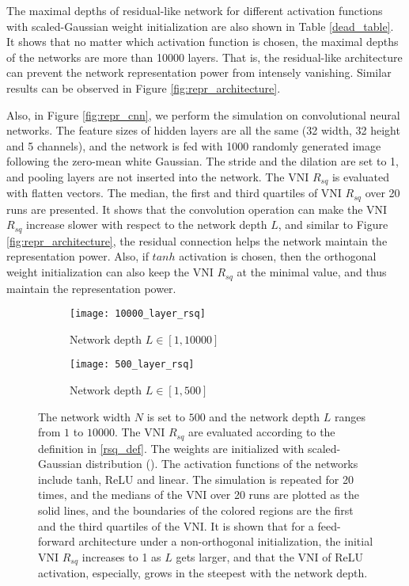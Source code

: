 The maximal depths of residual-like network for different activation functions with scaled-Gaussian
weight initialization are also shown in Table \ref{dead_table}.
It shows that no matter which activation function is chosen, the maximal depths of the networks are
more than 10000 layers. That is, the residual-like architecture can prevent the network representation
power from intensely vanishing. Similar results can be observed in Figure \ref{fig:repr_architecture}.

Also, in Figure \ref{fig:repr_cnn}, we perform the simulation on convolutional neural networks.
The feature sizes of hidden layers are all the same (32 width, 32 height and 5 channels), and the
network is fed with 1000 randomly generated image following the zero-mean white Gaussian.
The stride and the dilation are set to 1, and pooling layers are not inserted into the network.
The VNI $R_{sq}$ is evaluated with flatten vectors.
The median, the first and third quartiles of VNI $R_{sq}$ over 20 runs are presented.
It shows that the convolution operation can make the VNI $R_{sq}$ increase slower with respect to
the network depth $L$, and similar to Figure \ref{fig:repr_architecture}, the residual connection
helps the network maintain the representation power.
Also, if $tanh$ activation is chosen, then the orthogonal weight initialization can also keep the VNI
$R_{sq}$ at the minimal value, and thus maintain the representation power.

\begin{figure}[h]
    \centering
    \newcommand{\myWidth}{0.9\textwidth}
    \begin{subfigure}{\myWidth}
      \centering
      \caption{Network depth $L\in[1, 10000]$}
      \texttt{[image: 10000\_layer\_rsq]}
      \label{fig:repr_general_a}
    \end{subfigure}
    
    \begin{subfigure}{\myWidth}
      \centering
      \caption{Network depth $L\in[1, 500]$}
      \texttt{[image: 500\_layer\_rsq]}
      \label{fig:repr_general_b}
    \end{subfigure}%
    \caption[The initial VNI $R_{sq}$ of Gaussian initialized networks.]{
        The network width $N$ is set to $500$ and the network depth $L$ ranges from $1$ to
        $10000$. The VNI $R_{sq}$ are evaluated according to the definition in \eqref{rsq_def}.
        The weights are initialized with scaled-Gaussian distribution (\cite{xavier, he}).
        The activation functions of the networks include tanh, ReLU and linear.
        The simulation is repeated for 20 times, and the medians of the VNI over 20 runs
        are plotted as the solid lines, and the boundaries of the colored regions are the first
        and the third quartiles of the VNI. It is shown that for a feed-forward architecture
        under a non-orthogonal initialization, the initial VNI $R_{sq}$ increases to 1 as $L$
        gets larger, and that the VNI of ReLU activation, especially, grows in the steepest
        with the network depth.
    }
    \label{fig:repr_general}
\end{figure}


